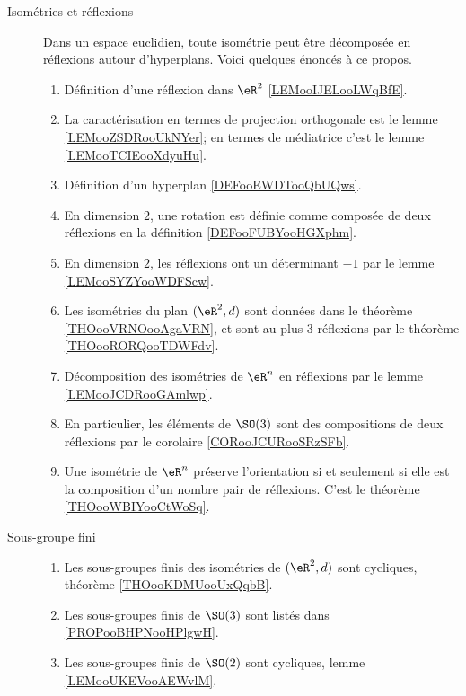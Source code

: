 \begin{description}
	\item[Isométries et réflexions]
	      Dans un espace euclidien, toute isométrie peut être décomposée en réflexions autour d'hyperplans. Voici quelques énoncés à ce propos.
	      \begin{enumerate}
		      \item
		            Définition d'une réflexion dans \( \eR^2\) \ref{LEMooIJELooLWqBfE}.
		      \item
		            La caractérisation en termes de projection orthogonale est le lemme \ref{LEMooZSDRooUkNYer}; en termes de médiatrice c'est le lemme \ref{LEMooTCIEooXdyuHu}.
		      \item
		            Définition d'un hyperplan \ref{DEFooEWDTooQbUQws}.
		      \item
		            En dimension \( 2\), une rotation est définie comme composée de deux réflexions en la définition \ref{DEFooFUBYooHGXphm}.
		      \item
		            En dimension \( 2\), les réflexions ont un déterminant \( -1\) par le lemme \ref{LEMooSYZYooWDFScw}.
		      \item
		            Les isométries du plan \( (\eR^2,d)\) sont données dans le théorème \ref{THOooVRNOooAgaVRN}, et sont au plus 3 réflexions par le théorème \ref{THOooRORQooTDWFdv}.
		      \item
		            Décomposition des isométries de \( \eR^n\) en réflexions par le lemme \ref{LEMooJCDRooGAmlwp}.
		      \item
		            En particulier, les éléments de \( \SO(3)\) sont des compositions de deux réflexions par le corolaire \ref{CORooJCURooSRzSFb}.
		      \item
		            Une isométrie de \( \eR^n\) préserve l'orientation si et seulement si elle est la composition d'un nombre pair de réflexions. C'est le théorème \ref{THOooWBIYooCtWoSq}.
	      \end{enumerate}
	\item[Sous-groupe fini]
	      \begin{enumerate}
		      \item
		            Les sous-groupes finis des isométries de \( (\eR^2,d)\) sont cycliques, théorème \ref{THOooKDMUooUxQqbB}.
		      \item
		            Les sous-groupes finis de \( \SO(3)\) sont listés dans \ref{PROPooBHPNooHPlgwH}.
		      \item
		            Les sous-groupes finis de \( \SO(2)\) sont cycliques, lemme \ref{LEMooUKEVooAEWvlM}.
	      \end{enumerate}
\end{description}
